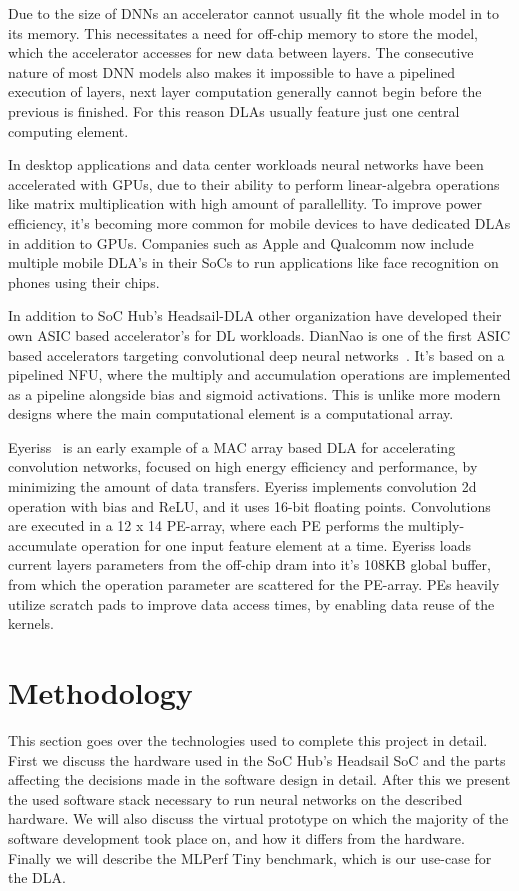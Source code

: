 \documentclass[12pt,a4paper,english
]{tunithesis}
\begin{document}
Due to the size of DNNs an accelerator cannot usually fit the whole model in to its memory. This necessitates a need for off-chip memory to store the model, which the accelerator accesses for new data between layers. The consecutive nature of most DNN models also makes it impossible to have a pipelined execution of layers, next layer computation generally cannot begin before the previous is finished. For this reason DLAs usually feature just one central computing element.

In desktop applications and data center workloads neural networks have been accelerated with GPUs, due to their ability to perform linear-algebra operations like matrix multiplication with high amount of parallellity. To improve power efficiency, it's becoming more common for mobile devices to have dedicated DLAs in addition to GPUs. Companies such as Apple and Qualcomm now include multiple mobile DLA's in their SoCs to run applications like face recognition on phones using their chips.

In addition to SoC Hub's Headsail-DLA other organization have developed their own ASIC based accelerator's for DL workloads.
DianNao is one of the first ASIC based accelerators targeting convolutional deep neural networks~\cite{chen_diannao_2014}. It's based on a pipelined NFU, where the multiply and accumulation operations are implemented as a pipeline alongside bias and sigmoid activations. This is unlike more modern designs where the main computational element is a computational array.

Eyeriss~\cite{chen_eyeriss_2017} is an early example of a MAC array based DLA for accelerating convolution networks, focused on high energy efficiency and performance, by minimizing the amount of data transfers. Eyeriss implements convolution 2d operation with bias and ReLU, and it uses 16-bit floating points. Convolutions are executed in a 12 x 14 PE-array, where each PE performs the multiply-accumulate operation for one input feature element at a time. Eyeriss loads current layers parameters from the off-chip dram into it's 108KB global buffer, from which the operation parameter are scattered for the PE-array. PEs heavily utilize scratch pads to improve data access times, by enabling data reuse of the kernels.

\chapter{Methodology}
This section goes over the technologies used to complete this project in detail. First we discuss the hardware used in the SoC Hub's Headsail SoC and the parts affecting the decisions made in the software design in detail. After this we present the used software stack necessary to run neural networks on the described hardware. We will also discuss the virtual prototype on which the majority of the software development took place on, and how it differs from the hardware. Finally we will describe the MLPerf Tiny benchmark, which is our use-case for the DLA.
\label{ch:methodology}
\end{document}
